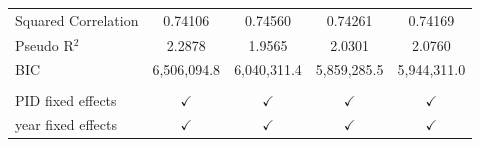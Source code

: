\begin{tabular}{lcccc}
   Squared Correlation & 0.74106         & 0.74560        & 0.74261        & 0.74169\\  
   Pseudo R$^2$        & 2.2878          & 1.9565         & 2.0301         & 2.0760\\  
   BIC                 & 6,506,094.8     & 6,040,311.4    & 5,859,285.5    & 5,944,311.0\\  
    \\
   PID fixed effects   & $\checkmark$    & $\checkmark$   & $\checkmark$   & $\checkmark$\\   
   year fixed effects  & $\checkmark$    & $\checkmark$   & $\checkmark$   & $\checkmark$\\   
   \bottomrule
\end{tabular}
\par\endgroup


